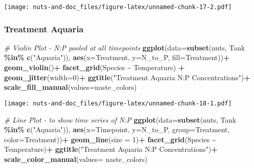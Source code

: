 \documentclass[
]{article}
\newenvironment{Shaded}{\begin{snugshade}}{\end{snugshade}}
\newcommand{\AttributeTok}[1]{\textcolor[rgb]{0.13,0.29,0.53}{#1}}
\newcommand{\CommentTok}[1]{\textcolor[rgb]{0.56,0.35,0.01}{\textit{#1}}}
\newcommand{\DecValTok}[1]{\textcolor[rgb]{0.00,0.00,0.81}{#1}}
\newcommand{\FunctionTok}[1]{\textcolor[rgb]{0.13,0.29,0.53}{\textbf{#1}}}
\newcommand{\NormalTok}[1]{#1}
\newcommand{\SpecialCharTok}[1]{\textcolor[rgb]{0.81,0.36,0.00}{\textbf{#1}}}
\newcommand{\StringTok}[1]{\textcolor[rgb]{0.31,0.60,0.02}{#1}}
\begin{document}
\texttt{[image: nuts-and-doc\_files/figure-latex/unnamed-chunk-17-2.pdf]}

\hypertarget{treatment-aquaria-4}{%
\subsubsection{Treatment Aquaria}\label{treatment-aquaria-4}}

\begin{Shaded}
\begin{Highlighting}[]
\CommentTok{\# Violin Plot {-} N:P pooled at all timepoints}
\FunctionTok{ggplot}\NormalTok{(}\AttributeTok{data=}\FunctionTok{subset}\NormalTok{(nuts, Tank }\SpecialCharTok{\%in\%} \FunctionTok{c}\NormalTok{(}\StringTok{"Aquaria"}\NormalTok{)), }\FunctionTok{aes}\NormalTok{(}\AttributeTok{x=}\NormalTok{Treatment, }\AttributeTok{y=}\NormalTok{N\_to\_P, }\AttributeTok{fill=}\NormalTok{Treatment))}\SpecialCharTok{+}
  \FunctionTok{geom\_violin}\NormalTok{()}\SpecialCharTok{+}
  \FunctionTok{facet\_grid}\NormalTok{(Species }\SpecialCharTok{\textasciitilde{}}\NormalTok{ Temperature) }\SpecialCharTok{+}
  \FunctionTok{geom\_jitter}\NormalTok{(}\AttributeTok{width=}\DecValTok{0}\NormalTok{)}\SpecialCharTok{+}
  \FunctionTok{ggtitle}\NormalTok{(}\StringTok{"Treatment Aquaria N:P Concentrations"}\NormalTok{)}\SpecialCharTok{+}
  \FunctionTok{scale\_fill\_manual}\NormalTok{(}\AttributeTok{values=}\NormalTok{naste\_colors)}
\end{Highlighting}
\end{Shaded}

\texttt{[image: nuts-and-doc\_files/figure-latex/unnamed-chunk-18-1.pdf]}

\begin{Shaded}
\begin{Highlighting}[]
\CommentTok{\# Line Plot {-} to show time series of N:P}
\FunctionTok{ggplot}\NormalTok{(}\AttributeTok{data=}\FunctionTok{subset}\NormalTok{(nuts, Tank }\SpecialCharTok{\%in\%} \FunctionTok{c}\NormalTok{(}\StringTok{"Aquaria"}\NormalTok{)), }\FunctionTok{aes}\NormalTok{(}\AttributeTok{x=}\NormalTok{Timepoint, }\AttributeTok{y=}\NormalTok{N\_to\_P, }\AttributeTok{group=}\NormalTok{Treatment, }\AttributeTok{color=}\NormalTok{Treatment))}\SpecialCharTok{+}
  \FunctionTok{geom\_line}\NormalTok{(}\AttributeTok{size =} \DecValTok{1}\NormalTok{)}\SpecialCharTok{+}
  \FunctionTok{facet\_grid}\NormalTok{(Species }\SpecialCharTok{\textasciitilde{}}\NormalTok{ Temperature)}\SpecialCharTok{+}
  \FunctionTok{ggtitle}\NormalTok{(}\StringTok{"Treatment Aquaria N:P Concentrations"}\NormalTok{)}\SpecialCharTok{+}
  \FunctionTok{scale\_color\_manual}\NormalTok{(}\AttributeTok{values=}\NormalTok{ naste\_colors)}
\end{Highlighting}
\end{Shaded}
\end{document}
